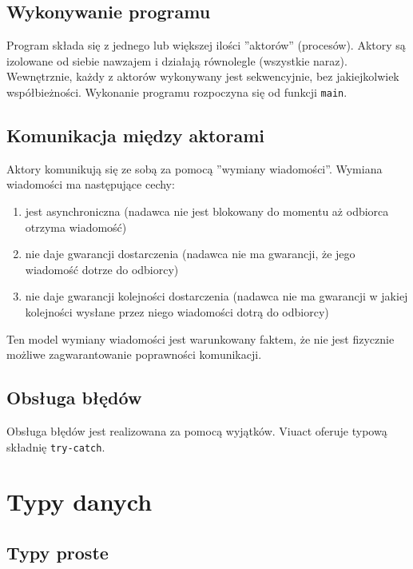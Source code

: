\subsection{Wykonywanie programu}

Program składa się z jednego lub większej ilości ''aktorów'' (procesów).
Aktory są izolowane od siebie nawzajem i działają równolegle (wszystkie naraz).
Wewnętrznie, każdy z aktorów wykonywany jest sekwencyjnie, bez jakiejkolwiek
współbieżności.
Wykonanie programu rozpoczyna się od funkcji \texttt{main}.

\subsection{Komunikacja między aktorami}

Aktory komunikują się ze sobą za pomocą ''wymiany wiadomości''.
Wymiana wiadomości ma następujące cechy:

\begin{enumerate}
    \item jest asynchroniczna (nadawca nie jest blokowany do momentu aż odbiorca otrzyma
        wiadomość)
    \item nie daje gwarancji dostarczenia (nadawca nie ma gwarancji, że jego wiadomość
        dotrze do odbiorcy)
    \item nie daje gwarancji kolejności dostarczenia (nadawca nie ma gwarancji w jakiej
        kolejności wysłane przez niego wiadomości dotrą do odbiorcy)
\end{enumerate}

Ten model wymiany wiadomości jest warunkowany faktem, że nie jest fizycznie
możliwe zagwarantowanie poprawności komunikacji.

\subsection{Obsługa błędów}

Obsługa błędów jest realizowana za pomocą wyjątków. Viuact oferuje typową
składnię \texttt{try-catch}.

\section{Typy danych}

\subsection{Typy proste}

